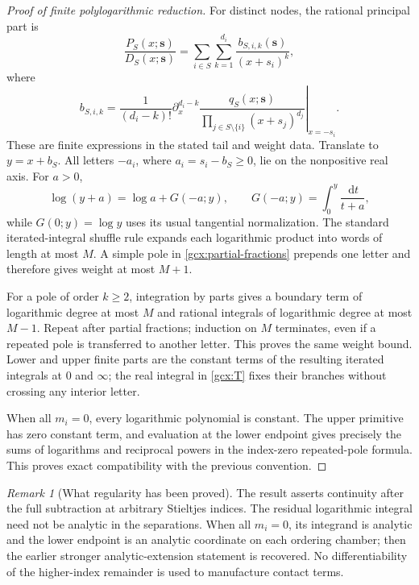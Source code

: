 \documentclass[11pt]{article}
\numberwithin{equation}{section}
\theoremstyle{plain}
\theoremstyle{definition}
\theoremstyle{remark}
\newtheorem{remark}[theorem]{Remark}
\newcommand{\dd}{\,\mathrm d}
\begin{document}
\begin{proof}[Proof of finite polylogarithmic reduction]
For distinct nodes, the rational principal part is
\begin{equation}\label{gcx:partial-fractions}
 \frac{P_S(x;\boldsymbol s)}{D_S(x;\boldsymbol s)}
  =\sum_{i\in S}\sum_{k=1}^{d_i}
       \frac{b_{S,i,k}(\boldsymbol s)}{(x+s_i)^k},
\end{equation}
where
\begin{equation}\label{gcx:b-coefficient}
 b_{S,i,k}=\frac1{(d_i-k)!}
 \left.\partial_x^{d_i-k}
 \frac{q_S(x;\boldsymbol s)}
      {\prod_{j\in S\setminus\{i\}}(x+s_j)^{d_j}}
 \right|_{x=-s_i}.
\end{equation}
These are finite expressions in the stated tail and weight data.
Translate to $y=x+b_S$.  All letters $-a_i$, where
$a_i=s_i-b_S\ge0$, lie on the nonpositive real axis.  For $a>0$,
\[
 \log(y+a)=\log a+G(-a;y),\qquad
 G(-a;y)=\int_0^y\frac{\dd t}{t+a},
\]
while $G(0;y)=\log y$ uses its usual tangential normalization.
The standard iterated-integral shuffle rule \cite{goncharov} expands each logarithmic product into words of
length at most $M$.  A simple pole in \eqref{gcx:partial-fractions}
prepends one letter and therefore gives weight at most $M+1$.

For a pole of order $k\ge2$, integration by parts gives a boundary term
of logarithmic degree at most $M$ and rational integrals of logarithmic
degree at most $M-1$.  Repeat after partial fractions; induction on $M$
terminates, even if a repeated pole is transferred to another letter.
This proves the same weight bound.  Lower and upper finite parts are the
constant terms of the resulting iterated integrals at $0$ and $\infty$;
the real integral in \eqref{gcx:T} fixes their branches without crossing
any interior letter.

When all $m_i=0$, every logarithmic polynomial is constant.  The upper
primitive has zero constant term, and evaluation at the lower endpoint
gives precisely the sums of logarithms and reciprocal powers in the
index-zero repeated-pole formula.  This proves exact compatibility with
the previous convention.
\end{proof}

\begin{remark}[What regularity has been proved]\label{gcx:regularity}
The result asserts continuity after the full subtraction at arbitrary
Stieltjes indices.  The residual logarithmic integral need not be
analytic in the separations.  When all $m_i=0$, its integrand is analytic
and the lower endpoint is an analytic coordinate on each ordering
chamber; then the earlier stronger analytic-extension statement is
recovered.  No differentiability of the higher-index remainder is used
to manufacture contact terms.
\end{remark}
\end{document}
